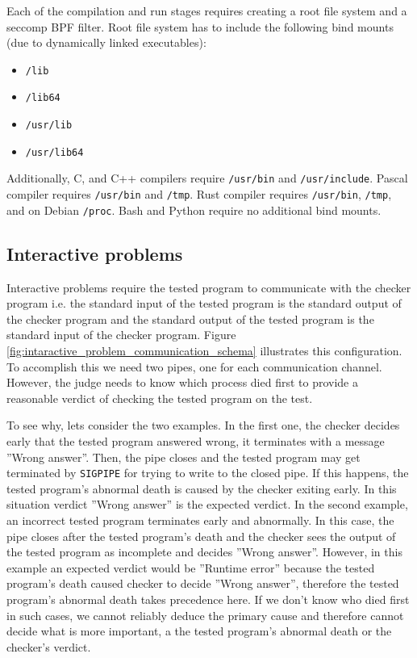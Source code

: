 \documentclass[en]{pracamgr}
\begin{document}
Each of the compilation and run stages requires creating a root file system and a seccomp BPF filter. Root file system has to include the following bind mounts (due to dynamically linked executables):
\begin{itemize}
    \item \texttt{/lib}
    \item \texttt{/lib64}
    \item \texttt{/usr/lib}
    \item \texttt{/usr/lib64}
\end{itemize}

Additionally, C, and C++ compilers require \texttt{/usr/bin} and \texttt{/usr/include}.
Pascal compiler requires \texttt{/usr/bin} and \texttt{/tmp}.
Rust compiler requires \texttt{/usr/bin}, \texttt{/tmp}, and on Debian \texttt{/proc}.
Bash and Python require no additional bind mounts.

\subsection{Interactive problems}

Interactive problems require the tested program to communicate with the checker program i.e. the standard input of the tested program is the standard output of the checker program and the standard output of the tested program is the standard input of the checker program. Figure \ref{fig:intaractive_problem_communication_schema} illustrates this configuration. To accomplish this we need two pipes, one for each communication channel. However, the judge needs to know which process died first to provide a reasonable verdict of checking the tested program on the test.

To see why, lets consider the two examples. In the first one, the checker decides early that the tested program answered wrong, it terminates with a message ''Wrong answer''. Then, the pipe closes and the tested program may get terminated by \texttt{SIGPIPE} for trying to write to the closed pipe. If this happens, the tested program's abnormal death is caused by the checker exiting early. In this situation verdict ''Wrong answer'' is the expected verdict. In the second example, an incorrect tested program terminates early and abnormally. In this case, the pipe closes after the tested program's death and the checker sees the output of the tested program as incomplete and decides ''Wrong answer''. However, in this example an expected verdict would be ''Runtime error'' because the tested program's death caused checker to decide ''Wrong answer'', therefore the tested program's abnormal death takes precedence here. If we don't know who died first in such cases, we cannot reliably deduce the primary cause and therefore cannot decide what is more important, a the tested program's abnormal death or the checker's verdict.
\end{document}
